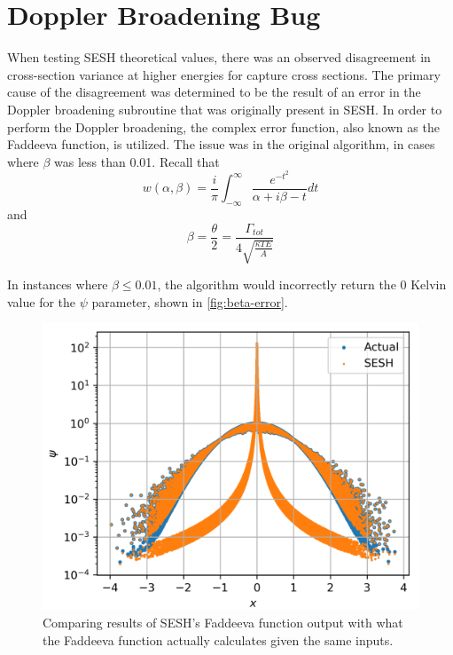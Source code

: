 \section{Doppler Broadening Bug}

When testing SESH theoretical values, there was an observed disagreement in cross-section variance at higher energies for capture cross sections.
    The primary cause of the disagreement was determined to be the result of an error in the Doppler broadening subroutine that was originally present in SESH. In order to perform the Doppler broadening, the complex error function, also known as the Faddeeva function, is utilized. The issue was in the original algorithm, in cases where $\beta$ was less than 0.01. Recall that
    \begin{equation}
        w(\alpha,\beta) = \frac{i}{\pi} \int_{-\infty}^{\infty} \frac{e^{-t^2}}{\alpha + i\beta - t}dt
    \end{equation}
    and
    \begin{equation}
        \beta = \frac{\theta}{2} = \frac{\Gamma_{tot}}{4\sqrt{\frac{ \kappa T E}{A}}}
        \label{eq:doppler-beta}
    \end{equation}

    In instances where $\beta \leq 0.01$, the algorithm would incorrectly return the 0 Kelvin value for the $\psi$ parameter, shown in \autoref{fig:beta-error}.
    \begin{figure}
        \centering
        \includegraphics[width=0.95\linewidth]{Implementation/Figures/beta-error.png}
        \caption{Comparing results of SESH's Faddeeva function output with what the Faddeeva function actually calculates given the same inputs.}
        \label{fig:beta-error}
    \end{figure}
    

